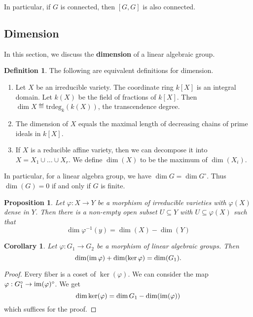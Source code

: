 \documentclass[]{pcmi}
\theoremstyle{plain}
\newtheorem{Proposition}[equation]{Proposition}
\newtheorem{Corollary}[equation]{Corollary}
\theoremstyle{definition}
\newtheorem{Definition}[equation]{Definition}
\begin{document}
In particular, if $G$ is connected, then $[G, G]$ is also connected. 

\subsection{Dimension}

In this section, we discuss the \textbf{dimension} of a linear algebraic group. 

\begin{Definition}
    The following are equivalent definitions for dimension. 
    \begin{enumerate}
        \item Let $X$ be an irreducible variety. The coordinate ring $k[X]$ is an integral domain. Let $k(X)$ be the field of fractions of $k[X]$. Then $\dim X \eqdef \text{trdeg}_k(k(X))$, the transcendence degree. 

        \item The dimension of $X$ equals the maximal length of decreasing chains of prime ideals in $k[X]$. 

        \item If $X$ is a reducible affine variety, then we can decompose it into $X = X_1 \cup \ldots \cup X_r$. We define $\dim(X)$ to be the maximum of $\dim (X_i)$. 
    \end{enumerate}
\end{Definition}

In particular, for a linear algebra group, we have $\dim G = \dim G^\circ$. Thus $\dim (G) = 0$ if and only if $G$ is finite. 

\begin{Proposition}
    Let $\varphi : X \to Y$ be a morphism of irreducible varieties with $\varphi(X)$ dense in $Y$. Then there is a non-empty open subset $U \subseteq Y$ with $U \subseteq \varphi(X)$ such that 
    \[
        \dim \varphi^{-1}(y) = \dim (X) - \dim (Y)
    \]
\end{Proposition}

\begin{Corollary}\label{cor:rank-nullity}
    Let $\varphi : G_1 \to G_2$ be a morphism of linear algebraic groups. Then 
    \[
        \dim (\operatorname{im} \varphi) + \dim (\ker \varphi) = \dim (G_1).
    \]
\end{Corollary}

\begin{proof}
    Every fiber is a coset of $\ker (\varphi)$. We can consider the map $\varphi : G_1^\circ \to \operatorname{im} (\varphi)^\circ$. We get 
    \[
        \dim \ker (\varphi) = \dim G_1 - \dim (\operatorname{im} (\varphi))
    \]
    which suffices for the proof. 
\end{proof}
\end{document}
